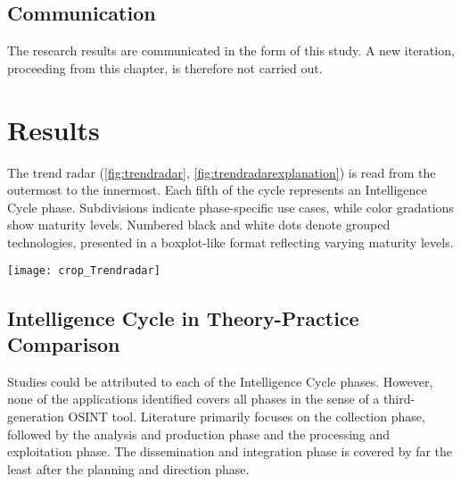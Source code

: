 \documentclass[10pt]{article}
\begin{document}
\subsection{Communication}

The research results are communicated in the form of this study.
A new iteration, proceeding from this chapter, is therefore not
carried out.

\section{Results}

The trend radar (\ref{fig:trendradar}, \ref{fig:trendradarexplanation}) is read from the outermost to the innermost.
Each fifth of the cycle represents an Intelligence Cycle phase. Subdivisions indicate
phase-specific use cases, while color gradations show maturity levels. Numbered black
and white dots denote grouped technologies, presented in a boxplot-like format reflecting
varying maturity levels.

\begin{figure*}[thb]
    \centering
    \texttt{[image: crop\_Trendradar]}
    \caption{Trend radar}
    \label{fig:trendradar}
\end{figure*}

\begin{figure*}[!thb]
    \centering
\end{figure*}

\subsection{Intelligence Cycle in Theory-Practice Comparison}

Studies could be attributed to each of the Intelligence Cycle phases. However,
none of the applications identified covers all phases in the sense of a third-generation
OSINT tool. Literature primarily focuses on the collection phase, followed by
the analysis and production phase and the processing and exploitation phase.
The dissemination and integration phase is covered by far the least after the planning
and direction phase.
\end{document}
